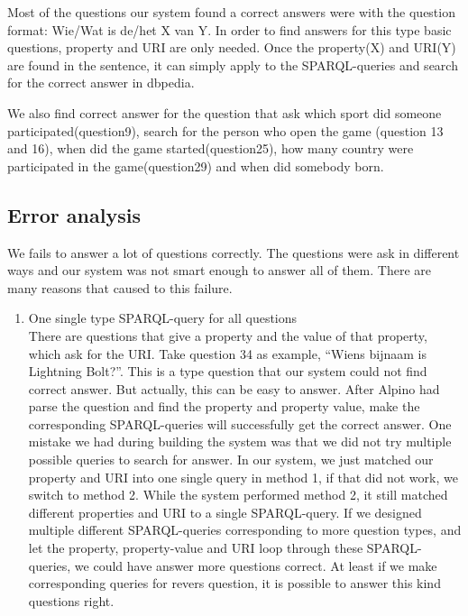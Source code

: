 \documentclass[a4paper,11pt]{article}
\begin{document}
Most of the questions our system found a correct answers were with the question format: Wie/Wat is de/het X van Y. In order to find answers for this type basic questions, property and URI are only needed. Once the property(X) and URI(Y) are found in the sentence, it can simply apply to the SPARQL-queries and search for the correct answer in dbpedia.

We also find correct answer for the question that ask which sport did someone participated(question9), search for the person who open the game (question 13 and 16), when did the game started(question25), how many country were participated in the game(question29) and when did somebody born.

\subsection{Error analysis}
We fails to answer a lot of questions correctly. The questions were ask in different ways and our system was not smart enough to answer all of them. There are many reasons that caused to this failure.

\begin{enumerate}
\item One single type SPARQL-query for all questions \\
There are questions that give a property and the value of that property, which ask for the URI. Take question 34 as example, “Wiens bijnaam is Lightning Bolt?”. This is a type question that our system could not find correct answer. But actually, this can be easy to answer. After Alpino had parse the question and find the property and property value, make the corresponding SPARQL-queries will successfully get the correct answer. One mistake we had during building the system was that we did not try multiple possible queries to search for answer. In our system, we just matched our property and URI into one single query in method 1, if that did not work, we switch to method 2. While the system performed method 2, it still matched different properties and URI to a single SPARQL-query. If we designed multiple different SPARQL-queries corresponding to more question types, and let the property, property-value and URI loop through these SPARQL-queries, we could have answer more questions correct. At least if we make corresponding queries for revers question, it is possible to answer this kind questions right.
\end{enumerate}




\end{document}
